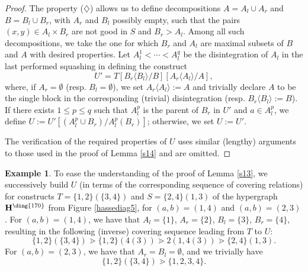 \documentclass{article}
\theoremstyle{plain}
\theoremstyle{definition}
\newtheorem{example}[thm]{\sc Example}
\begin{document}
\begin{proof}
 The property ($\diamondsuit$) allows us to define decompositions 
 $A=A_l\cup A_r$ and $B=B_l\cup B_r$, with $A_r$ and $B_l$ possibly empty, such that the pairs $(x,y)\in A_l\times B_r$ are not good in $S$ and $B_r>A_l$. Among all such decompositions, we take the one for which $B_r$ and $A_l$ are maximal subsets of $B$ and $A$ with desired properties. Let $A^1_l<\cdots <A^q_l$ be the disintegration of $A_l$ in the last performed squashing in defining the construct $$U'=T[B_r\langle B_l \rangle/B][A_r\langle A_l \rangle /A],$$ where, if $A_r=\emptyset$ (resp. $B_l=\emptyset$), we set $A_r\langle A_l\rangle :=A$ and trivially declare $A$ to be the single block in the corresponding (trivial) disintegration (resp. $B_r\langle B_l\rangle := B$). If there exists $1\leq p\leq q$ such that $A_l^p$ is the parent of $B_r$ in $U'$ and $a\in A_l^p$, we define $U:=U'[(A_l^p\cup B_r)/A_l^p(B_r)]$; otherwise, we set $U:=U'$. 
 
 The verification of the required properties of $U$ uses similar (lengthy) arguments to those used in the proof of Lemma \ref{s14} and are omitted.
 \end{proof} 

\begin{example}
To ease the understanding of the proof of Lemma \ref{s13}, we successively build $U$ (in terms of the corresponding sequence of covering relations) for constructs $T=\{1,2\}(\{3,4\})$ and $S=\{2,4\}(1,3)$ of the hypergraph ${\bf H}^{\text{\ding{170}}}$ from Figure \ref{hassediag5}, for $(a,b)=(1,4)$ and $(a,b)=(2,3)$. For $(a,b)=(1,4)$, we have that $A_l=\{1\}$, $A_r=\{2\}$, $B_l=\{3\}$, $B_r=\{4\}$, resulting in the following (inverse) covering sequence leading from $T$ to $U$: 
$$\{1,2\}(\{3,4\}) \gtrdot \{1,2\}(4(3)) \gtrdot 2(1,4(3)) \gtrdot \{2,4\}(1,3).$$ For $(a,b)=(2,3)$, we have that $A_r=B_l=\emptyset$, and we trivially have $$\{1,2\}(\{3,4\}) \gtrdot \{1,2,3,4\}.$$
\end{example}
\end{document}
